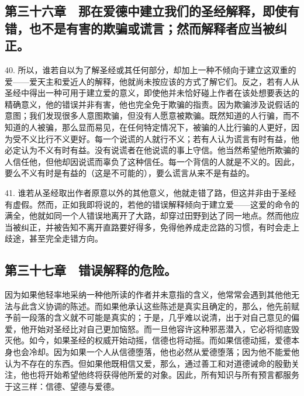 
\subsection{第三十六章　那在爱德中建立我们的圣经解释，即使有错，也不是有害的欺骗或谎言；然而解释者应当被纠正。}

40. 所以，谁若自以为了解圣经或其任何部分，却加上一种不倾向于建立这双重的爱——爱天主和爱近人的解释，他就尚未按应该的方式了解它们。反之，若有人从圣经中得出一种可用于建立爱的意义，即使他并未恰好碰上作者在该处想要表达的精确意义，他的错误并非有害，他也完全免于欺骗的指责。因为欺骗涉及说假话的意图；我们发现很多人意图欺骗，但没有人愿意被欺骗。既然知道的人行骗，而不知道的人被骗，那么显而易见，在任何特定情况下，被骗的人比行骗的人更好，因为受不义比行不义更好。每一个说谎的人就行不义；若有人认为谎言有时有益，他必定认为不义有时有益。没有说谎者在他说谎的事上守信。他当然希望他所欺骗的人信任他，但他却因说谎而辜负了这种信任。每一个背信的人就是不义的。因此，要么不义有时是有益的（这是不可能的），要么谎言从来不是有益的。\par

41. 谁若从圣经取出作者原意以外的其他意义，他就走错了路，但这并非由于圣经有虚假。然而，正如我即将说的，若他的错误解释倾向于建立爱——这爱的命令的满全，他就如同一个人错误地离开了大路，却穿过田野到达了同一地点。然而他应当被纠正，并被告知不离开直路要好得多，免得他养成走岔路的习惯，有时会走上歧途，甚至完全走错方向。\par


\subsection{第三十七章　错误解释的危险。}

因为如果他轻率地采纳一种他所读的作者并未意指的含义，他常常会遇到其他他无法与此含义协调的陈述。而如果他承认这些陈述是真实且确定的，那么，他先前赋予前一段落的含义就不可能是真实的；于是，几乎难以说清，出于对自己意见的偏爱，他开始对圣经比对自己更加恼怒。而一旦他容许这种邪恶潜入，它必将彻底毁灭他。如今，如果圣经的权威开始动摇，信德也将动摇。而如果信德动摇，爱德本身也会冷却。因为如果一个人从信德堕落，他也必然从爱德堕落；因为他不能爱他认为不存在的东西。但如果他既相信又爱，那么，通过善工和对道德诫命的殷勤关注，他也将开始希望他终将获得他所爱的对象。因此，所有知识与所有预言都服务于这三样：信德、望德与爱德。\par

